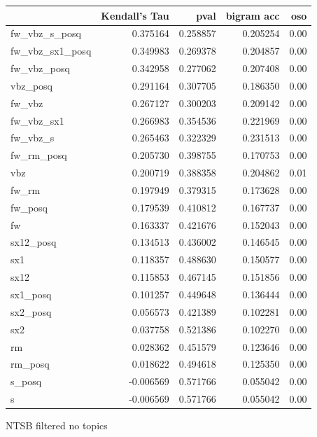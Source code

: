 \documentclass[11pt]{article}
\begin{document}
\begin{figure*}[h]
\begin{tabular}{lrrrr}
\toprule
{} &  Kendall's Tau &      pval &  bigram acc &   oso \\
\midrule
fw\_vbz\_s\_posq   &       0.375164 &  0.258857 &    0.205254 &  0.00 \\
fw\_vbz\_sx1\_posq &       0.349983 &  0.269378 &    0.204857 &  0.00 \\
fw\_vbz\_posq     &       0.342958 &  0.277062 &    0.207408 &  0.00 \\
vbz\_posq        &       0.291164 &  0.307705 &    0.186350 &  0.00 \\
fw\_vbz          &       0.267127 &  0.300203 &    0.209142 &  0.00 \\
fw\_vbz\_sx1      &       0.266983 &  0.354536 &    0.221969 &  0.00 \\
fw\_vbz\_s        &       0.265463 &  0.322329 &    0.231513 &  0.00 \\
fw\_rm\_posq      &       0.205730 &  0.398755 &    0.170753 &  0.00 \\
vbz             &       0.200719 &  0.388358 &    0.204862 &  0.01 \\
fw\_rm           &       0.197949 &  0.379315 &    0.173628 &  0.00 \\
fw\_posq         &       0.179539 &  0.410812 &    0.167737 &  0.00 \\
fw              &       0.163337 &  0.421676 &    0.152043 &  0.00 \\
sx12\_posq       &       0.134513 &  0.436002 &    0.146545 &  0.00 \\
sx1             &       0.118357 &  0.488630 &    0.150577 &  0.00 \\
sx12            &       0.115853 &  0.467145 &    0.151856 &  0.00 \\
sx1\_posq        &       0.101257 &  0.449648 &    0.136444 &  0.00 \\
sx2\_posq        &       0.056573 &  0.421389 &    0.102281 &  0.00 \\
sx2             &       0.037758 &  0.521386 &    0.102270 &  0.00 \\
rm              &       0.028362 &  0.451579 &    0.123646 &  0.00 \\
rm\_posq         &       0.018622 &  0.494618 &    0.125350 &  0.00 \\
s\_posq          &      -0.006569 &  0.571766 &    0.055042 &  0.00 \\
s               &      -0.006569 &  0.571766 &    0.055042 &  0.00 \\
\bottomrule
\end{tabular}
\caption{NTSB filtered no topics}
\end{figure*}
\end{document}
